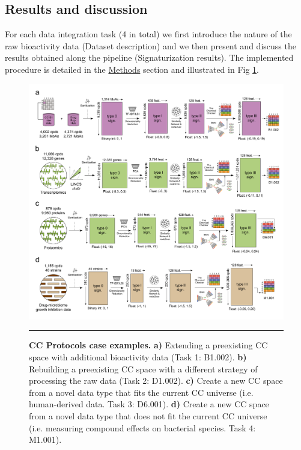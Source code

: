 \subsection{Results and discussion}


For each data integration task (4 in total) we first introduce the nature of the raw bioactivity data (Dataset description) and we then present and discuss the results obtained along the pipeline (Signaturization results). The implemented procedure is detailed in the \hyperref[Protocols_Methods]{Methods} section and illustrated in Fig \ref{Protocols_Fig2}.



\begin{figure}[t!]
  \centering
  \includegraphics[width=\linewidth]{figures/Protocols/Main/Pipeline_v6.png}
  \vspace{-10mm}
  \caption{
    \textbf{CC Protocols case examples.} 
    \textbf{a)} Extending a preexisting CC space with additional bioactivity data (Task 1: B1.002).
    \textbf{b)} Rebuilding a preexisting CC space with a different strategy of processing the raw data (Task 2: D1.002).
    \textbf{c)} Create a new CC space from a novel data type that fits the current CC universe (i.e. human-derived data. Task 3: D6.001). 
    \textbf{d)} Create a new CC space from a novel data type that does not fit the current CC universe (i.e. measuring compound effects on bacterial species. Task 4: M1.001).
  }
  \rule[0ex]{\textwidth}{0.5pt}
  \vspace{-5mm}
  \label{Protocols_Fig2}
\end{figure}


